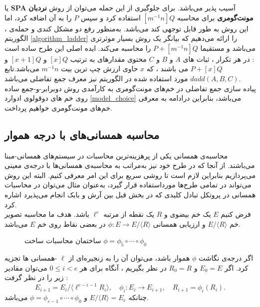 یا
\textbf{SPA}
\cite{spa}
آسیب پذیر می‌باشد. برای جلوگیری از این حمله می‌توان از روش
\textbf{نردبان مونت‌گومری}
\cite{montgomery}
برای محاسبه 
$[m^{-1}n]Q$ 
استفاده کرد و سپس 
$P$
را به آن اضافه کرد، اما این روش به طور قابل ‌توجهی کند می‌باشد.
به‌منظور رفع دو مشکل کندی و حمله‌ی
، الگوریتم
\ref{algorithm_ladder}
 را ارائه می‌دهیم که بیانگر یک روش بسیار موثرتری  می‌باشد و مستقیما 
$P + [m^{-1}n]Q$
را محاسبه می‌کند. ایده اصلی این طرح ساده است : در هر تکرار ، ثبات های 
$A$
و
$B$
و
$C$
محتوی مقدارهای به ترتیب
$[x]Q$
و
$[x+1]Q$
و
$P+[x]Q$
می ‌باشند ، که 
$x$
حاوی ارزش چپ ترین بیت
$m^{-1}n$
می‌باشد.تابع 
$dadd(A,B,C)$
مورد استفاده شده در الگوریتم نیز معرف جمع تفاضلی 
\cite{montgomery}
می‌باشد. 
\\
پیاده سازی جمع تفاضلی در خم‌های مونت‌گومری به کارآمدی روش دوبرابر-و-جمع ساده روی خم های دوقولوی ادوارد
\ref{model_choice}
می‌باشد، بنابراین درادامه به معرفی خم‌های مونت‌گومری خواهیم پرداخت.

\subsection{\bf   محاسبه همسانی‌های با درجه هموار}\label{smooth_isogeny}

محاسبه‌ی همسانی یکی از پرهزینه‌ترین محاسبات در سیستم‌های همسانی‌-مبنا می‌باشند. از آنجا که در طرح خود نیز به‌مراتب به محاسبه‌ی همسانی‌ها با درجه‌ی معینی می‌پردازیم بنابراین  لازم است تا روشی سریع برای این امر معرفی کنیم. البته این روش می‌تواند در تمامی طرح‌ها مورداستفاده قرار گیرد، به‌عنوان مثال می‌توان در محاسبات همسانی در پروتکل تبادل کلیدی که در بخش قبل بین آرش و بابک انجام می‌پذیرد اشاره کرد.
\\
 فرض کنیم 
$E$
یک خم بیضوی و 
$R$
یک نقطه از مرتبه 
$\ell^e$
باشد. هدف ما محاسبه تصویر خم 
$E/ \langle R \rangle $
و ارزیابی همسانی 
$\phi : E \rightarrow E/ \langle R \rangle $
در بعضی نقاط روی خم 
$E$
می‌باشد. 
\begin{figure}[H]\label{}
	\begin{center}
		
		
		\caption{
			ساختمان محاسبات ساخت 
			$\phi = {\phi}_5 \circ \cdots  \circ {\phi}_0$    
		}
		
	\end{center}
\end{figure}
اگر درجه‌ی نگاشت 
$\phi$
هموار باشد، می‌توان آن را به زنجیره‌ای از
$\ell$
-همسانی ها تجزیه کرد. اگر
$E_0 = E$
و
$R_0 = R$
در نظر بگیریم ، آنگاه برای هر 
$0 \leq i < e $
می‌توان مقادیر زیر را در نظر گرفت :
$$
E_{i+1} = E_i / \langle \ell^{e-i-1}R_i \rangle , \quad
\phi_i : E_i \rightarrow E_{i+1} , \quad
R_{i+1} = \phi_i(R_i).
$$
چنانکه 
$E / \langle R \rangle = E_e$
و
$\phi = \phi_{e-1} \circ \cdots \circ \phi_0$
می‌باشد.


